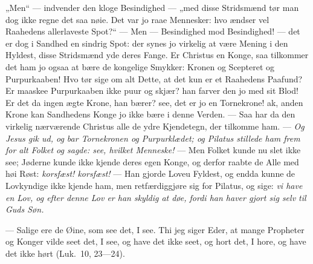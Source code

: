 \documentclass[12pt,a4paper]{book}
\begin{document}
„Men“ --- indvender den kloge Besindighed --- „med disse Stridsmænd tør man dog
ikke regne det saa nøie. Det var jo raae Mennesker: hvo ændser vel Raahedens
allerlaveste Spot?“ --- Men --- Besindighed mod Besindighed! --- det er dog i
Sandhed en sindrig Spot: der synes jo virkelig at være Mening i den
Hyldest, disse Stridsmænd yde deres Fange. Er Christus en Konge, saa tilkommer
det ham jo ogsaa at bære de kongelige Smykker: Kronen og Scepteret og
Purpurkaaben! Hvo tør sige om alt Dette, at det kun er et Raahedens Paafund? Er
maaskee Purpurkaaben ikke puur og skjær? han farver den jo med sit Blod! Er det
da ingen ægte Krone, han bærer? see, det er jo en Tornekrone! ak, anden Krone kan
Sandhedens Konge jo ikke bære i denne Verden. --- Saa har da den virkelig
nærværende Christus alle de ydre Kjendetegn, der tilkomme ham. --- \emph{Og Jesus
gik ud, og bar Tornekronen og Purpurklædet; og Pilatus stillede ham frem for alt
Folket og sagde: see, hvilket Menneske!} --- Men Folket kunde nu slet ikke see;
Jøderne kunde ikke kjende deres egen Konge, og derfor raabte de Alle med høi
Røst: \emph{korsfæst! korsfæst!} --- Han gjorde Loveu Fyldest, og endda kunne de
Lovkyndige ikke kjende ham, men retfærdiggjøre sig for Pilatus, og sige:
\emph{vi have en Lov, og efter denne Lov er han skyldig at døe, fordi han haver
gjort sig selv til Guds Søn.}

%
\begingroup\large
--- Salige ere de Øine, som see det, I see. Thi jeg siger Eder, at mange
Propheter og Konger vilde seet det, I see, og have det ikke seet, og hort det, I
hore, og have det ikke hørt (Luk.\ 10, 23---24).
\par\endgroup
\end{document}
